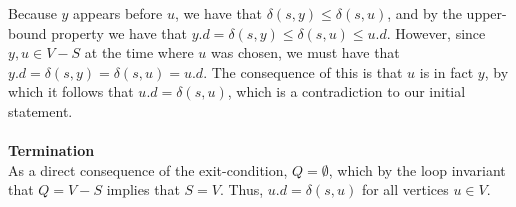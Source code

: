 Because $y$ appears before $u$, we have that $\delta(s, y) \leq \delta(s, u)$,
and by the upper-bound property we have that $y.d = \delta(s, y) \leq
\delta(s, u) \leq u.d$. However, since $y, u \in V - S$ at the time where $u$
was chosen, we must have that $y.d = \delta(s, y) = \delta(s, u) = u.d$. The
consequence of this is that $u$ is in fact $y$, by which it follows that
$u.d = \delta(s, u)$, which is a contradiction to our initial statement.
\\\\
\noindent \textbf{Termination} \\
As a direct consequence of the exit-condition, $Q = \emptyset$, which by the
loop invariant that $Q = V - S$ implies that $S = V$. Thus, $u.d =
\delta(s, u)$ for all vertices $u \in V$.


